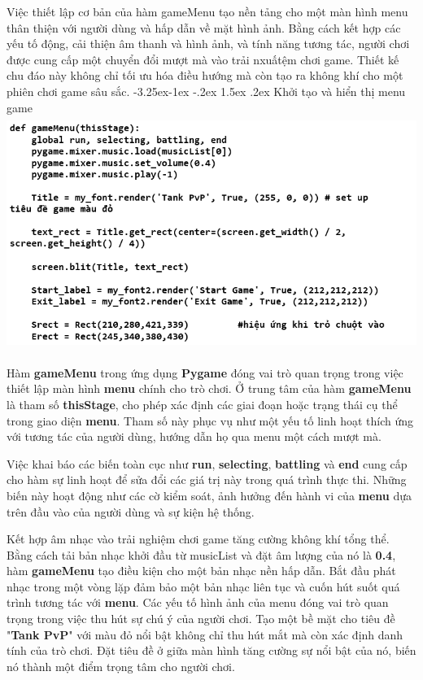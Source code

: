 \documentclass[a4paper]{article}
\makeatletter
\newcounter {subsubsubsection}[subsubsection]
\newcommand\subsubsubsection{\@startsection{subsubsubsection}{4}{\z@}%
                                     {-3.25ex\@plus -1ex \@minus -.2ex}%
                                     {1.5ex \@plus .2ex}%
                                     {\normalfont\normalsize\bfseries}}
\makeatother
\begin{document}
Việc thiết lập cơ bản của hàm gameMenu tạo nền tảng cho một màn hình
menu thân thiện với người dùng và hấp dẫn về mặt hình ảnh. Bằng cách kết
hợp các yếu tố động, cải thiện âm thanh và hình ảnh, và tính năng tương
tác, người chơi được cung cấp một chuyển đổi mượt mà vào trải nxuấtệm
chơi game. Thiết kế chu đáo này không chỉ tối ưu hóa điều hướng mà còn
tạo ra không khí cho một phiên chơi game sâu sắc.
\subsubsubsection{Khởi tạo và hiển thị menu game}
\includegraphics[width=6in,height=3in]{image28_1.png}

Hàm \textbf{gameMenu} trong ứng dụng \textbf{Pygame} đóng vai trò quan trọng trong việc thiết lập màn hình \textbf{menu} chính cho trò chơi. Ở trung tâm của hàm \textbf{gameMenu} là tham số \textbf{thisStage}, cho phép xác định các giai đoạn hoặc trạng thái cụ thể trong giao diện \textbf{menu}. Tham số này phục vụ như một yếu tố linh hoạt thích ứng với tương tác của người dùng, hướng dẫn họ qua menu một cách mượt mà.

Việc khai báo các biến toàn cục như \textbf{run}, \textbf{selecting}, \textbf{battling} và \textbf{end} cung cấp cho hàm sự linh hoạt để sửa đổi các giá trị này trong quá trình thực thi. Những biến này hoạt động như các cờ kiểm soát, ảnh hưởng đến hành vi của \textbf{menu} dựa trên đầu vào của người dùng và sự kiện hệ thống.

Kết hợp âm nhạc vào trải nghiệm chơi game tăng cường không khí tổng
thể. Bằng cách tải bản nhạc khởi đầu từ musicList và đặt âm lượng của nó
là \textbf{0.4}, hàm \textbf{gameMenu} tạo điều kiện cho một bản nhạc nền hấp dẫn. Bắt đầu phát nhạc trong một vòng lặp đảm bảo một bản nhạc liên tục và cuốn hút suốt quá trình tương tác với \textbf{menu}. Các yếu tố hình ảnh của menu đóng vai trò quan trọng trong việc thu hút sự chú ý của người chơi. Tạo một bề mặt cho tiêu đề "\textbf{Tank PvP}" với màu đỏ nổi bật không chỉ thu hút mắt mà còn xác định danh tính của trò chơi. Đặt tiêu đề ở giữa màn hình tăng cường sự nổi bật của nó, biến nó thành một điểm trọng tâm cho người
chơi.
\end{document}
